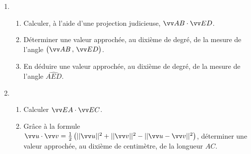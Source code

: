 \documentclass[a4paper,11pt]{article}
\begin{document}
\begin{enumerate}
	\item 
	\begin{enumerate}
		\item Calculer, à l'aide d'une projection judicieuse, $\vect{AB}\cdot\vect{ED}$.
		\item Déterminer une valeur approchée, au dixième de degré, de la mesure de l'angle $\big( \vect{AB}\,,\,\vect{ED} \big)$.
		\item En déduire une valeur approchée, au dixième de degré, de la mesure de l'angle $\widehat{AED}$.
	\end{enumerate}
	\item 
	\begin{enumerate}
		\item Calculer $\vect{EA}\cdot\vect{EC}$.
		\item Grâce à la formule $\vect{u}\cdot\vect{v}=\tfrac{1}{2}\left(||\vect{u}||^2+||\vect{v}||^2-||\vect{u}-\vect{v}||^2\right)$, déterminer une valeur approchée, au dixième de centimètre, de la longueur $AC$.
	\end{enumerate}
\end{enumerate}
\end{document}
